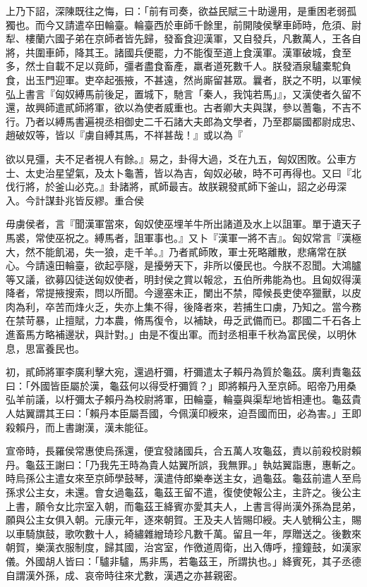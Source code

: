 \begin{pinyinscope}
上乃下詔，深陳既往之悔，曰：「前有司奏，欲益民賦三十助邊用，是重困老弱孤獨也。而今又請遣卒田輪臺。輪臺西於車師千餘里，前開陵侯擊車師時，危須、尉犁、樓蘭六國子弟在京師者皆先歸，發畜食迎漢軍，又自發兵，凡數萬人，王各自將，共圍車師，降其王。諸國兵便罷，力不能復至道上食漢軍。漢軍破城，食至多，然士自載不足以竟師，彊者盡食畜產，羸者道死數千人。朕發酒泉驢橐駝負食，出玉門迎軍。吏卒起張掖，不甚遠，然尚廝留甚眾。曩者，朕之不明，以軍候弘上書言『匈奴縛馬前後足，置城下，馳言「秦人，我饨若馬」』，又漢使者久留不還，故興師遣貳師將軍，欲以為使者威重也。古者卿大夫與謀，參以蓍龜，不吉不行。乃者以縛馬書遍視丞相御史二千石諸大夫郎為文學者，乃至郡屬國都尉成忠、趙破奴等，皆以『虜自縛其馬，不祥甚哉！』或以為『

欲以見彊，夫不足者視人有餘。』易之，卦得大過，爻在九五，匈奴困敗。公車方士、太史治星望氣，及太卜龜蓍，皆以為吉，匈奴必破，時不可再得也。又曰『北伐行將，於釜山必克。』卦諸將，貳師最吉。故朕親發貳師下釜山，詔之必毋深入。今計謀卦兆皆反繆。重合侯

毋虜侯者，言『聞漢軍當來，匈奴使巫埋羊牛所出諸道及水上以詛軍。單于遺天子馬裘，常使巫祝之。縛馬者，詛軍事也。』又卜『漢軍一將不吉』。匈奴常言『漢極大，然不能飢渴，失一狼，走千羊。』乃者貳師敗，軍士死略離散，悲痛常在朕心。今請遠田輪臺，欲起亭隧，是擾勞天下，非所以優民也。今朕不忍聞。大鴻臚等又議，欲募囚徒送匈奴使者，明封侯之賞以報忿，五伯所弗能為也。且匈奴得漢降者，常提掖搜索，問以所聞。今邊塞未正，闌出不禁，障候長吏使卒獵獸，以皮肉為利，卒苦而烽火乏，失亦上集不得，後降者來，若捕生口虜，乃知之。當今務在禁苛暴，止擅賦，力本農，脩馬復令，以補缺，毋乏武備而已。郡國二千石各上進畜馬方略補邊狀，與計對。」由是不復出軍。而封丞相車千秋為富民侯，以明休息，思富養民也。

初，貳師將軍李廣利擊大宛，還過杅彌，杅彌遣太子賴丹為質於龜茲。廣利責龜茲曰：「外國皆臣屬於漢，龜茲何以得受杅彌質？」即將賴丹入至京師。昭帝乃用桑弘羊前議，以杅彌太子賴丹為校尉將軍，田輪臺，輪臺與渠犁地皆相連也。龜茲貴人姑翼謂其王曰：「賴丹本臣屬吾國，今佩漢印綬來，迫吾國而田，必為害。」王即殺賴丹，而上書謝漢，漢未能征。

宣帝時，長羅侯常惠使烏孫還，便宜發諸國兵，合五萬人攻龜茲，責以前殺校尉賴丹。龜茲王謝曰：「乃我先王時為貴人姑翼所誤，我無罪。」執姑翼詣惠，惠斬之。時烏孫公主遣女來至京師學鼓琴，漢遣侍郎樂奉送主女，過龜茲。龜茲前遣人至烏孫求公主女，未還。會女過龜茲，龜茲王留不遣，復使使報公主，主許之。後公主上書，願令女比宗室入朝，而龜茲王絳賓亦愛其夫人，上書言得尚漢外孫為昆弟，願與公主女俱入朝。元康元年，逐來朝賀。王及夫人皆賜印綬。夫人號稱公主，賜以車騎旗鼓，歌吹數十人，綺繡雜繒琦珍凡數千萬。留且一年，厚贈送之。後數來朝賀，樂漢衣服制度，歸其國，治宮室，作徼道周衛，出入傳呼，撞鐘鼓，如漢家儀。外國胡人皆曰：「驢非驢，馬非馬，若龜茲王，所謂执也。」絳賓死，其子丞德自謂漢外孫，成、哀帝時往來尤數，漢遇之亦甚親密。


\end{pinyinscope}
